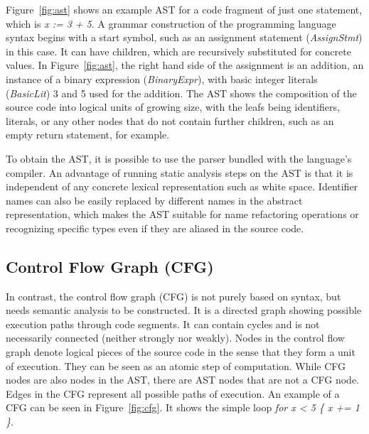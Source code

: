 

Figure~\ref{fig:ast} shows an example \acrshort{AST} for a code fragment of just one statement, which is
\textit{x := 3 + 5}.
A grammar construction of the programming language syntax begins with a start symbol, such as an assignment statement
(\textit{AssignStmt}) in this case.
It can have children, which are recursively substituted for concrete values.
In Figure~\ref{fig:ast}, the right hand side of the assignment is an addition, an instance of a binary expression
(\textit{BinaryExpr}), with basic integer literals (\textit{BasicLit}) 3 and 5 used for the addition.
The \acrshort{AST} shows the composition of the source code into logical units of growing size, with the leafs being
identifiers, literals, or any other nodes that do not contain further children, such as an empty return statement, for
example.

To obtain the \acrshort{AST}, it is possible to use the parser bundled with the language's compiler.
An advantage of running static analysis steps on the \acrshort{AST} is that it is independent of any concrete lexical
representation such as white space.
Identifier names can also be easily replaced by different names in the abstract representation, which makes the
\acrshort{AST} suitable for name refactoring operations or recognizing specific types even if they are aliased in the
source code.



\subsection{Control Flow Graph (CFG)}\label{subsec:background:static-code-analysis:cfg}

In contrast, the control flow graph (\acrshort{CFG}) is not purely based on syntax, but needs semantic analysis to be
constructed.
It is a directed graph showing possible execution paths through code segments.
It can contain cycles and is not necessarily connected (neither strongly nor weakly).
Nodes in the control flow graph denote logical pieces of the source code in the sense that they form a unit of
execution.
They can be seen as an atomic step of computation.
While \acrshort{CFG} nodes are also nodes in the \acrshort{AST}, there are \acrshort{AST} nodes that are not a
\acrshort{CFG} node.
Edges in the \acrshort{CFG} represent all possible paths of execution.
An example of a \acrshort{CFG} can be seen in Figure~\ref{fig:cfg}.
It shows the simple loop \textit{for x < 5 \{ x += 1 \}}.

